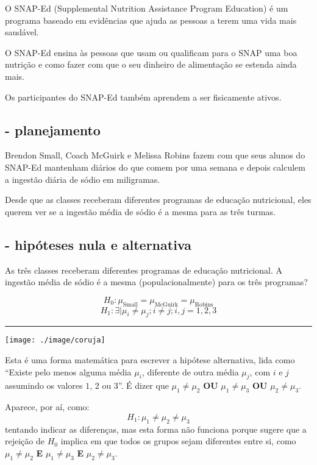 \documentclass[]{article}
\begin{document}
O SNAP-Ed (Supplemental Nutrition Assistance Program Education) é um
programa baseado em evidências que ajuda as pessoas a terem uma vida
mais saudável.

O SNAP-Ed ensina às pessoas que usam ou qualificam para o SNAP uma boa
nutrição e como fazer com que o seu dinheiro de alimentação se estenda
ainda mais.

Os participantes do SNAP-Ed também aprendem a ser fisicamente ativos.

\subsection{- planejamento}\label{planejamento}

Brendon Small, Coach McGuirk e Melissa Robins fazem com que seus alunos
do SNAP-Ed mantenham diários do que comem por uma semana e depois
calculem a ingestão diária de sódio em miligramas.

Desde que as classes receberam diferentes programas de educação
nutricional, eles querem ver se a ingestão média de sódio é a mesma para
as três turmas.

\subsection{- hipóteses nula e
alternativa}\label{hipoteses-nula-e-alternativa}

As três classes receberam diferentes programas de educação nutricional.
A ingestão média de sódio é a mesma (populacionalmente) para os três
programas?

\[H_0: \mu_{\text{Small}} = \mu_{\text{McGuirk}} = \mu_{\text{Robins}}\]
\[H_1: \exists |\mu_i \ne \mu_j; i \ne j; i,j=1,2,3\]

\begin{center}\rule{0.5\linewidth}{\linethickness}\end{center}

\begin{flushleft}\texttt{[image: ./image/coruja]} \end{flushleft}

Esta é uma forma matemática para escrever a hipótese alternativa, lida
como ``Existe pelo menos alguma média \(\mu_i\), diferente de outra
média \(\mu_j\), com \(i\) e \(j\) assumindo os valores \(1\), \(2\) ou
\(3\)''. É dizer que \(\mu_1 \ne \mu_2\) \textbf{OU} \(\mu_1 \ne \mu_3\)
\textbf{OU} \(\mu_2 \ne \mu_3\).

Aparece, por aí, como: \[H_1: \mu_1 \ne \mu_2 \ne \mu_3\] tentando
indicar as diferenças, mas esta forma não funciona porque sugere que a
rejeição de \(H_0\) implica em que todos os grupos sejam diferentes
entre si, como \(\mu_1 \ne \mu_2\) \textbf{E} \(\mu_1 \ne \mu_3\)
\textbf{E} \(\mu_2 \ne \mu_3\).
\end{document}
